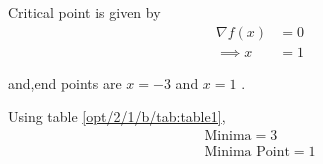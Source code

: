 \begin{enumerate}
    Critical point is given by
    \begin{align}
        \nabla f(x) &= 0 \\
        \implies x &= 1
    \end{align}
    
    and,end points are $x=-3$ and $x=1$ .
    
    Using table \ref{opt/2/1/b/tab:table1},
    \begin{align}
        \boxed{\text{Minima} = 3}\\
        \boxed{\text{Minima Point} = 1}
    \end{align}
    
\end{enumerate}

